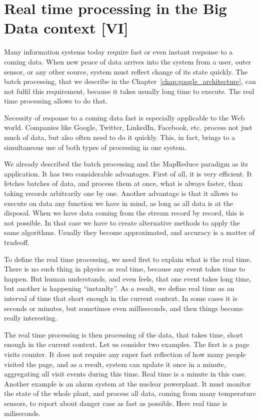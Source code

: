 \chapter{Real time processing in the Big Data context [VI]}
\label{chap:real_time_processing}

Many information systems today require fast or even instant response to a coming data.
When new peace of data arrives into the system from a user, outer sensor, or any other source, system must reflect change of its state quickly. 
The batch processing, that we describe in the Chapter~\ref{chap:google_architecture}, can not fulfil this requirement, because it takes usually long time to execute.
The real time processing allows to do that.

Necessity of response to a coming data fast is especially applicable to the Web world.
Companies like Google, Twitter, LinkedIn, Facebook, etc. process not just much of data, but also often need to do it quickly.
This, in fact, brings to a simultaneous use of both types of processing in one system.

We already described the batch processing and the MapReduce paradigm as its application.
It has two considerable advantages.
First of all, it is very efficient.
It fetches batches of data, and process them at once, what is always faster, than taking records arbitrarily one by one.
Another advantage is that it allows to execute on data any function we have in mind, as long as all data is at the disposal.
When we have data coming from the stream record by record, this is not possible.
In that case we have to create alternative methods to apply the same algorithms.
Usually they become approximated, and accuracy is a matter of tradeoff.

To define the real time processing, we need first to explain what is the real time.
There is no such thing in physics as real time, because any event takes time to happen.
But human understands, and even feels, that one event takes long time, but another is happening ``instanlty''.
As a result, we define real time as an interval of time that short enough in the current context.
In some cases it is seconds or minutes, but sometimes even milliseconds, and then things become really interesting.

The real time processing is then processing of the data, that takes time, short enough in the current context.
Let us consider two examples.
The first is a page visits counter.
It does not require any super fast reflection of how many people visited the page, and as a result, system can update it once in a minute, aggregating all visit events during this time.
Real time is a minute in this case.
Another example is an alarm system at the nuclear powerplant.
It must monitor the state of the whole plant, and process all data, coming from many temperature sensors, to report about danger case as fast as possible.
Here real time is miliseconds.

